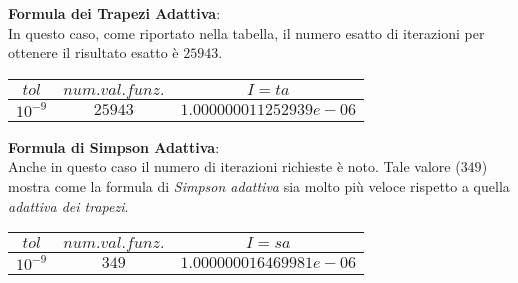 		\textbf{Formula dei Trapezi Adattiva}:\\[0.5cm]
			In questo caso, come riportato nella tabella, il numero esatto di iterazioni per ottenere il 
			risultato esatto è $25943$.
			\begin{small}
			\begin{center}
			\begin{tabular}{|c|c|c|}
				\hline
					$tol$ & $num. val. funz.$ & $I=ta$ \\
    				\hline
    					$10^{-9}$ & $25943$ & $1.000000011252939e-06$ \\
				\hline
			\end{tabular}
			\end{center}
			\end{small}
		\textbf{Formula di Simpson Adattiva}:\\[0.5cm]
			Anche in questo caso il numero di iterazioni richieste è noto. Tale valore ($349$) mostra come la
			formula di \textit{Simpson adattiva} sia molto più veloce rispetto a quella \textit{adattiva dei trapezi}.
			\begin{small}
			\begin{center}
			\begin{tabular}{|c|c|c|}
				\hline
					$tol$ & $num. val. funz.$ & $I=sa$ \\
    				\hline
    					$10^{-9}$ & $349$ & $1.000000016469981e-06$ \\
					\hline
			\end{tabular}
			\end{center}
			\end{small}